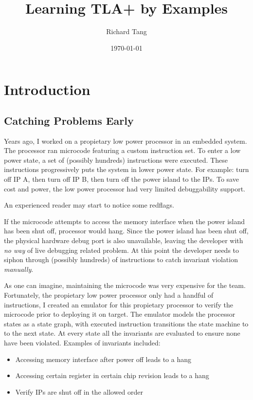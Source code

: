 \documentclass{report}
\title{Learning TLA+ by Examples}
\author{Richard Tang}
\date{\today}
\begin{document}
\maketitle
\tableofcontents

\chapter{Introduction}

\section{Catching Problems Early}

Years ago, I worked on a propietary low power processor in an embedded system.
The processor ran microcode featuring a custom instruction set. To enter a low
power state, a set of (possibly hundreds) instructions were executed. These
instructions progressively puts the system in lower power state. For example:
turn off IP A, then turn off IP B, then turn off the power island to the IPs. To
save cost and power, the low power processor had very limited debuggability
support.\newline

An experienced reader may start to notice some redflags.\newline

If the microcode attempts to access the memory interface when the power island
has been shut off, processor would hang. Since the power island has been shut
off, the physical hardware debug port is also unavailable, leaving the developer
with \textit{no way} of live debugging related problem. At this point the
developer needs to siphon through (possibly hundreds) of instructions to catch
invariant violation \textit{manually}.\newline

As one can imagine, maintaining the microcode was very expensive for the team.
Fortunately, the propietary low power processor only had a handful of
instructions, I created an emulator for this propietary processor to verify the
microcode prior to deploying it on target. The emulator models the processor
states as a state graph, with executed instruction transitions the state machine
to to the next state. At every state all the invariants are evaluated to ensure
none have been violated. Examples of invariants included:
\begin{itemize}
    \item Accessing memory interface after power off leads to a hang
    \item Accessing certain register in certain chip revision leads to a hang 
    \item Verify IPs are shut off in the allowed order
\end{itemize}
\end{document}
